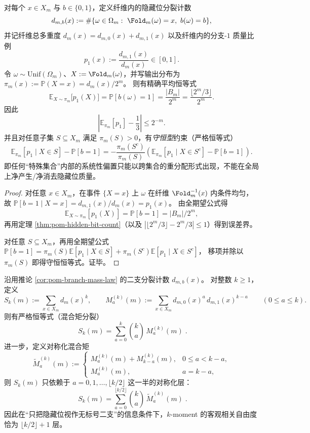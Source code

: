 \begin{corollary}[全局分支质量守恒与子集偏置约束]\label{cor:pom-branch-mass-law}
对每个 \(x\in X_m\) 与 \(b\in\{0,1\}\)，定义纤维内的隐藏位分裂计数
\[
d_{m,b}(x):=\#\{\omega\in\Omega_m:\ \Fold_m(\omega)=x,\ b(\omega)=b\},
\]
并记纤维总多重度 \(d_m(x)=d_{m,0}(x)+d_{m,1}(x)\) 以及纤维内的分支-\(1\) 质量比例
\[
p_1(x):=\frac{d_{m,1}(x)}{d_m(x)}\in[0,1].
\]
令 \(\omega\sim\mathrm{Unif}(\Omega_m)\)、\(X:=\Fold_m(\omega)\)，并写输出分布为 \(\pi_m(x):=\mathbb{P}(X=x)=d_m(x)/2^m\)。
则有精确平均恒等式
\[
\boxed{\;
\mathbb{E}_{X\sim\pi_m}\bigl[p_1(X)\bigr]
=\mathbb{P}[b(\omega)=1]
=\frac{|B_m|}{2^m}
=\frac{\lfloor 2^m/3\rfloor}{2^m}. \;}
\]
因此
\[
\left|\mathbb{E}_{\pi_m}[p_1]-\frac13\right|\le 2^{-m}.
\]
并且对任意子集 \(S\subseteq X_m\) 满足 \(\pi_m(S)>0\)，有\emph{守恒型}约束（严格恒等式）
\[
\boxed{\;
\mathbb{E}_{\pi_m}[p_1\mid X\in S]-\mathbb{P}[b=1]
=-\frac{\pi_m(S^c)}{\pi_m(S)}
\left(\mathbb{E}_{\pi_m}[p_1\mid X\in S^c]-\mathbb{P}[b=1]\right). \;}
\]
即任何“特殊集合”内部的系统性偏置只能以跨集合的重分配形式出现，不能在全局上净产生/净消去隐藏位质量。
\end{corollary}
\begin{proof}
对任意 \(x\in X_m\)，在事件 \(\{X=x\}\) 上 \(\omega\) 在纤维 \(\Fold_m^{-1}(x)\) 内条件均匀，故
\(
\mathbb{P}[b=1\mid X=x]=d_{m,1}(x)/d_m(x)=p_1(x)
\)。
由全期望公式得
\[
\mathbb{E}_{X\sim\pi_m}[p_1(X)]=\mathbb{P}[b=1]=|B_m|/2^m,
\]
再用定理 \ref{thm:pom-hidden-bit-count}（以及 \(|\lfloor 2^m/3\rfloor-2^m/3|\le 1\)）得到误差界。
\par
对任意 \(S\subseteq X_m\)，再用全期望公式
\(
\mathbb{P}[b=1]=\pi_m(S)\mathbb{E}[p_1\mid X\in S]+\pi_m(S^c)\mathbb{E}[p_1\mid X\in S^c]
\)，
移项并除以 \(\pi_m(S)\) 即得守恒恒等式。证毕。
\end{proof}

\begin{proposition}\label{prop:pom-hiddenbit-mixed-moment-cluster}\label{prop:pom-mixed-moment-clusters}
沿用推论 \ref{cor:pom-branch-mass-law} 的二支分裂计数 \(d_{m,b}(x)\)。
对整数 \(k\ge 1\)，定义
\[
S_k(m):=\sum_{x\in X_m} d_m(x)^k,
\qquad
M^{(k)}_{a}(m):=\sum_{x\in X_m} d_{m,0}(x)^a\,d_{m,1}(x)^{k-a}\qquad(0\le a\le k).
\]
则有严格恒等式（混合矩分裂）
\[
\boxed{\;
S_k(m)=\sum_{a=0}^{k}\binom{k}{a}\,M^{(k)}_{a}(m)\; }.
\]
进一步，定义对称化混合矩
\[
\widetilde M^{(k)}_{a}(m):=
\begin{cases}
M^{(k)}_{a}(m)+M^{(k)}_{k-a}(m), & 0\le a<k-a,\\
M^{(k)}_{a}(m), & a=k-a,
\end{cases}
\]
则 \(S_k(m)\) 只依赖于 \(a=0,1,\dots,\lfloor k/2\rfloor\) 这一半的对称化层：
\[
\boxed{\;
S_k(m)=\sum_{a=0}^{\lfloor k/2\rfloor}\binom{k}{a}\,\widetilde M^{(k)}_{a}(m)\; }.
\]
因此在“只把隐藏位视作无标号二支”的信息条件下，\(k\)-moment 的客观相关自由度恰为 \(\lfloor k/2\rfloor+1\) 层。
\end{proposition}

